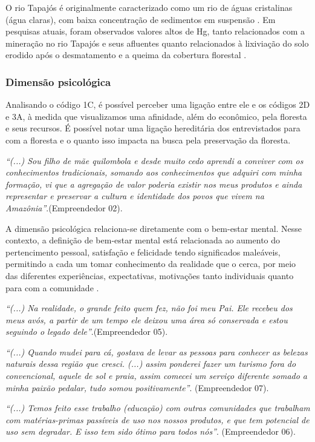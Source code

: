 O rio Tapajós é originalmente caracterizado como um rio de águas cristalinas (água claras), com baixa concentração de sedimentos em suspensão \cite{Diniz2022NotaTapajos}. Em pesquisas atuais, foram observados valores altos de Hg, tanto relacionados com a mineração no rio Tapajós e seus afluentes \cite{SilvaMontes2022TheApproach} quanto relacionados à lixiviação do solo erodido após o desmatamento e a queima da cobertura florestal \cite{Lino2019TotalAmazon}.


\subsubsection*{Dimensão psicológica}

Analisando o código 1C, é possível perceber uma ligação entre ele e os códigos 2D e 3A, à medida que visualizamos uma afinidade, além do econômico, pela floresta e seus recursos. É possível notar uma ligação hereditária dos entrevistados para com a floresta e o quanto isso impacta na busca pela preservação da floresta.

\textit{“(...) Sou filho de mãe quilombola e desde muito cedo aprendi a conviver com os conhecimentos tradicionais, somando aos conhecimentos que adquiri com minha formação, vi que a agregação de valor poderia existir nos meus produtos e ainda representar e preservar a cultura e identidade dos povos que vivem na Amazônia”}.(Empreendedor 02).

A dimensão psicológica relaciona-se diretamente com o bem-estar mental. Nesse contexto, a definição de bem-estar mental está relacionada ao aumento do pertencimento pessoal, satisfação e felicidade tendo significados maleáveis, permitindo a cada um tomar conhecimento da realidade que o cerca, por meio das diferentes experiências, expectativas, motivações tanto individuais quanto para com a comunidade \cite{Mogilner2012HowChoice}. 


\textit{“(...) Na realidade, o grande feito quem fez, não foi meu Pai. Ele recebeu dos meus avós, a partir de um tempo ele deixou uma área só conservada e estou seguindo o legado dele”}.(Empreendedor 05).

\textit{“(...) Quando mudei para cá, gostava de levar as pessoas para conhecer as belezas naturais dessa região que cresci. (...) assim ponderei fazer um turismo fora do convencional, aquele de sol e praia, assim comecei um serviço diferente somado a minha paixão pedalar, tudo somou positivamente”}. (Empreendedor 07).

\textit{“(...) Temos feito esse trabalho (educação) com outras comunidades que trabalham com matérias-primas passíveis de uso nos nossos produtos, e que tem potencial de uso sem degradar. E isso tem sido ótimo para todos nós”}. (Empreendedor 06).

